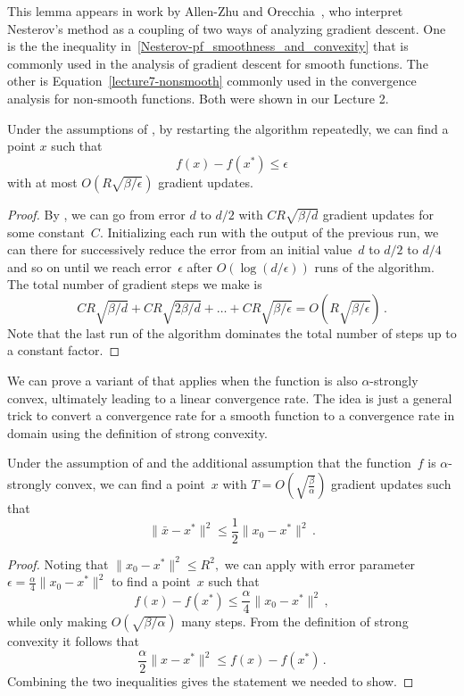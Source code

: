 This lemma appears in work by Allen-Zhu and Orecchia~\cite{allen2014linear}, who
interpret Nesterov's method as a coupling of two ways of analyzing gradient
descent. One is the the inequality
in~\eqref{Nesterov-pf_smoothness_and_convexity} that is commonly used in the
analysis of gradient descent for smooth functions. The other is
Equation~\ref{lecture7-nonsmooth} commonly used in the convergence analysis for
non-smooth functions. Both were shown in our Lecture 2.

\begin{theorem}
Under the assumptions of , by restarting the algorithm
repeatedly, we can find a point $x$ such that
\[
f(x)-f(x^*)\le\epsilon
\]
with at most $O(R\sqrt{\beta/\epsilon})$ gradient updates.
\end{theorem}
\begin{proof}
By , we can go from error $d$ to $d/2$ with
$CR\sqrt{\beta/d}$ gradient updates for some constant~$C$. 
Initializing each run with the output of
the previous run, we can there for successively reduce the error from an initial
value~$d$ to $d/2$ to $d/4$ and so on until we reach error~$\epsilon$ after
$O(\log(d/\epsilon))$ runs of the algorithm. The total number of gradient steps
we make is
\[
CR\sqrt{\beta/d} 
+CR\sqrt{2\beta/d}
+\dots+CR\sqrt{\beta/\epsilon}
= O\left(R\sqrt{\beta/\epsilon}\right)\,.
\]
Note that the last run of the algorithm dominates the total number of steps up to a
constant factor.
\end{proof}

We can prove a variant of  that applies when the
function is also $\alpha$-strongly convex, ultimately leading to a linear
convergence rate. The idea is just a general trick to convert a convergence rate
for a smooth function to a convergence rate in domain using the definition of
strong convexity.

\begin{lemma}
Under the assumption of  and the additional assumption
that the function~$f$ is $\alpha$-strongly convex, we 
can find a point~$x$ with $T = O\left(\sqrt{\frac{\beta}{\alpha}}\right)$
gradient updates such that
\[
\|\bar x - x^*\|^2 \leq \frac12\|x_0-x^*\|^2\,.
\]
\end{lemma}
\begin{proof}
Noting that $\|x_0-x^*\|^2\le R^2,$ we can apply  with
error parameter $\epsilon = \frac{\alpha}4 \|x_0-x^*\|^2$ to find a point~$x$ such that
\[
f(x)-f(x^*)\le \frac\alpha4\|x_0-x^*\|^2\,,
\]
while only making $O\left(\sqrt{\beta/\alpha}\right)$ many steps.
From the definition of strong convexity it follows that
\[
\frac\alpha2 \|x-x^*\|^2 \le f(x)-f(x^*)\,.
\]
Combining the two inequalities gives the statement we needed to show.
\end{proof}

